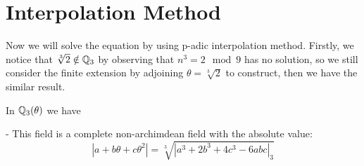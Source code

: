 \section{Interpolation Method}

Now we will solve the equation by using p-adic interpolation method. Firstly, we notice that \(\sqrt[3]{2} \notin \mathbb{Q}_3\) by observing that \(n^3 = 2 \mod 9\) has no solution, so we still consider the finite extension by adjoining \(\theta = \sqrt[3]{2}\) to construct, then we have the similar result.

\begin{proposition}
    In \(\mathbb{Q}_3 (\theta)\) we have

    - This field is a complete non-archimdean field with the absolute value:
    \[|a+b\theta+c\theta^2| = \sqrt[3]{|a^3+2b^3+4c^3-6abc|_3}\]
    
\end{proposition}